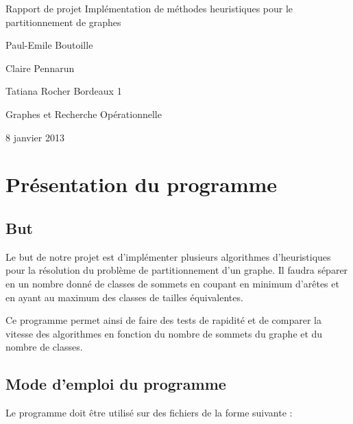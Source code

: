 \documentclass[12pt]{article}
\begin{document}
\begin{titlepage}
\begin{center}

\hfill
\vfill
\bigskip
\huge{Rapport de projet} 
\vfill
\bigskip 
\Huge 
\bigskip Implémentation de méthodes heuristiques pour le partitionnement de graphes \par 
\vfill
\Large Paul-Emile Boutoille \par
		Claire Pennarun \par 
		Tatiana Rocher
\vfill
\Large Bordeaux 1 \par \Large Graphes et Recherche Opérationnelle		
		\bigskip 
\bigskip

\Large
8 janvier 2013
\end{center}
\end{titlepage}

\tableofcontents
\newpage


\section{Présentation du programme}

\subsection{But}

Le but de notre projet est d'implémenter plusieurs algorithmes d’heuristiques pour la résolution du problème de partitionnement d’un graphe. Il faudra séparer en un nombre donné de classes de sommets en coupant en minimum d'arêtes et en ayant au maximum des classes de tailles équivalentes. 
~\par Ce programme permet ainsi de faire des tests de rapidité et de comparer la vitesse des algorithmes en fonction du nombre de sommets du graphe et du nombre de classes.

\subsection{Mode d'emploi du programme}

Le programme doit être utilisé sur des fichiers de la forme suivante :
~\\

~\\
~\\
\end{document}
